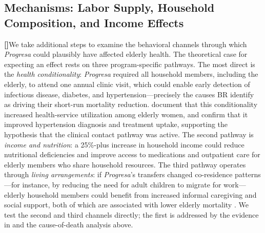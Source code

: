 \documentclass[12pt]{article}
\newcounter{paragraphnum}
\newcommand{\p}{\refstepcounter{paragraphnum}\textbf{[\theparagraphnum]}\enspace}
\begin{document}
\subsection{Mechanisms: Labor Supply, Household Composition, and Income Effects}\label{s:mechanisms}

\p We take additional steps to examine the behavioral channels through which \textit{Progresa} could plausibly have affected elderly health. The theoretical case for expecting an effect rests on three program-specific pathways. The most direct is the \textit{health conditionality}: \textit{Progresa} required all household members, including the elderly, to attend one annual clinic visit, which could enable early detection of infectious disease, diabetes, and hypertension—precisely the causes BR identify as driving their short-run mortality reduction. \cite{BehrmanParker2013Demography} document that this conditionality increased health-service utilization among elderly women, and \cite{Aguila2024EHB} confirm that it improved hypertension diagnosis and treatment uptake, supporting the hypothesis that the clinical contact pathway was active. The second pathway is \textit{income and nutrition}: a 25\%-plus increase in household income could reduce nutritional deficiencies and improve access to medications and outpatient care for elderly members who share household resources. The third pathway operates through \textit{living arrangements}: if \textit{Progresa}'s transfers changed co-residence patterns—for instance, by reducing the need for adult children to migrate for work—elderly household members could benefit from increased informal caregiving and social support, both of which are associated with lower elderly mortality \citep{duflo2000child}. We test the second and third channels directly; the first is addressed by the evidence in \cite{Aguila2024EHB} and the cause-of-death analysis above.
\end{document}
